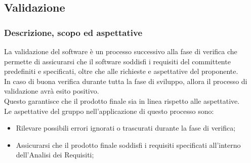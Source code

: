 \subsection{Validazione}

\subsubsection{Descrizione, scopo ed aspettative}

La validazione del software è un processo successivo alla fase di verifica che permette di assicurarsi che il software soddisfi i requisiti del committente predefiniti e specificati, 
oltre che alle richieste e aspettative del proponente. \\

In caso di buona verifica durante tutta la fase di sviluppo, allora il processo di validazione avrà esito positivo. \\
Questo garantisce che il prodotto finale sia in linea rispetto alle aspettative. \\

Le aspettative del gruppo nell'applicazione di questo processo sono:
\begin{itemize}
    \item Rilevare possibili errori ignorati o trascurati durante la fase di verifica;
    \item Assicurarsi che il prodotto finale soddisfi i requisiti specificati all'interno dell'Analisi dei Requisiti;
\end{itemize}

